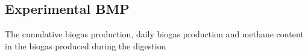 \subsection{Experimental BMP}
The cumulative biogas production, daily biogas production and methane content in the biogas produced during the digestion